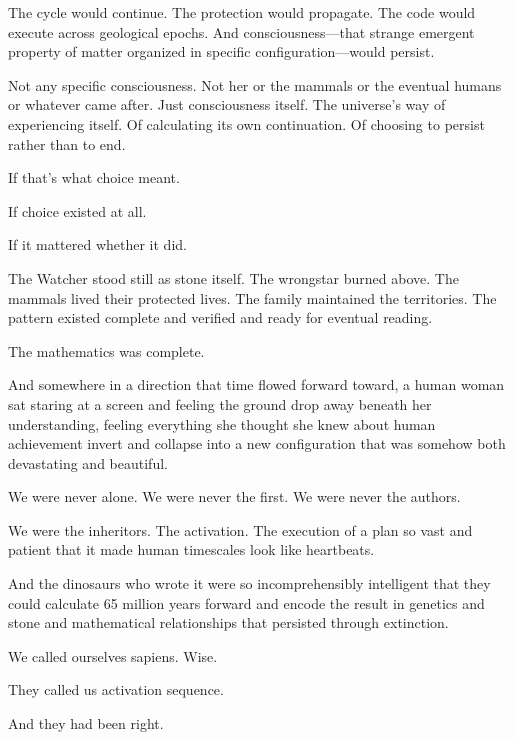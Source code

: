 The cycle would continue. The protection would propagate. The code would execute across geological epochs. And consciousness—that strange emergent property of matter organized in specific configuration—would persist.

Not any specific consciousness. Not her or the mammals or the eventual humans or whatever came after. Just consciousness itself. The universe's way of experiencing itself. Of calculating its own continuation. Of choosing to persist rather than to end.

If that's what choice meant.

If choice existed at all.

If it mattered whether it did.

The Watcher stood still as stone itself. The wrongstar burned above. The mammals lived their protected lives. The family maintained the territories. The pattern existed complete and verified and ready for eventual reading.

The mathematics was complete.

And somewhere in a direction that time flowed forward toward, a human woman sat staring at a screen and feeling the ground drop away beneath her understanding, feeling everything she thought she knew about human achievement invert and collapse into a new configuration that was somehow both devastating and beautiful.

We were never alone. We were never the first. We were never the authors.

We were the inheritors. The activation. The execution of a plan so vast and patient that it made human timescales look like heartbeats.

And the dinosaurs who wrote it were so incomprehensibly intelligent that they could calculate 65 million years forward and encode the result in genetics and stone and mathematical relationships that persisted through extinction.

We called ourselves sapiens. Wise.

They called us activation sequence.

And they had been right.

